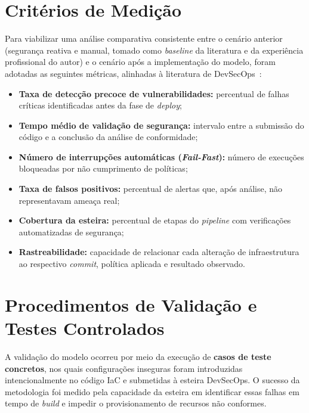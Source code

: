\section{Critérios de Medição}
\label{sec:metricas}

Para viabilizar uma análise comparativa consistente entre o cenário anterior (segurança reativa e manual, tomado como \textit{baseline} da literatura e da experiência profissional do autor) e o cenário após a implementação do modelo, foram adotadas as seguintes métricas, alinhadas à literatura de DevSecOps~:

\begin{itemize}
    \item \textbf{Taxa de detecção precoce de vulnerabilidades:} percentual de falhas críticas identificadas antes da fase de \textit{deploy};
    \item \textbf{Tempo médio de validação de segurança:} intervalo entre a submissão do código e a conclusão da análise de conformidade;
    \item \textbf{Número de interrupções automáticas (\textit{Fail-Fast}):} número de execuções bloqueadas por não cumprimento de políticas;
    \item \textbf{Taxa de falsos positivos:} percentual de alertas que, após análise, não representavam ameaça real;
    \item \textbf{Cobertura da esteira:} percentual de etapas do \textit{pipeline} com verificações automatizadas de segurança;
    \item \textbf{Rastreabilidade:} capacidade de relacionar cada alteração de infraestrutura ao respectivo \textit{commit}, política aplicada e resultado observado.
\end{itemize}

\section{Procedimentos de Validação e Testes Controlados}
\label{sec:testes-controlados}

A validação do modelo ocorreu por meio da execução de \textbf{casos de teste concretos}, nos quais configurações inseguras foram introduzidas intencionalmente no código IaC e submetidas à esteira DevSecOps. O sucesso da metodologia foi medido pela capacidade da esteira em identificar essas falhas em tempo de \textit{build} e impedir o provisionamento de recursos não conformes.

